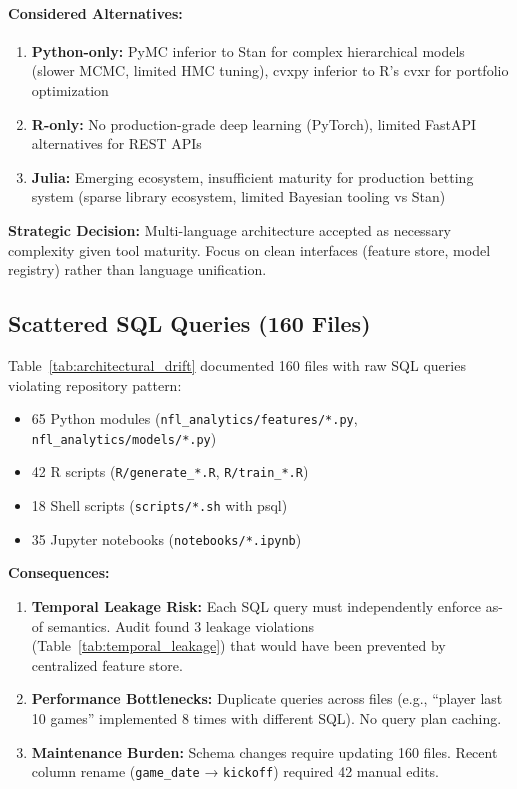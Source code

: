 \paragraph{Considered Alternatives:}
\begin{enumerate}
    \item \textbf{Python-only:} PyMC inferior to Stan for complex hierarchical models (slower MCMC, limited HMC tuning), cvxpy inferior to R's cvxr for portfolio optimization
    \item \textbf{R-only:} No production-grade deep learning (PyTorch), limited FastAPI alternatives for REST APIs
    \item \textbf{Julia:} Emerging ecosystem, insufficient maturity for production betting system (sparse library ecosystem, limited Bayesian tooling vs Stan)
\end{enumerate}

\textbf{Strategic Decision:} Multi-language architecture accepted as necessary complexity given tool maturity. Focus on clean interfaces (feature store, model registry) rather than language unification.

\subsection{Scattered SQL Queries (160 Files)}

Table~\ref{tab:architectural_drift} documented 160 files with raw SQL queries violating repository pattern:
\begin{itemize}
    \item 65 Python modules (\texttt{nfl\_analytics/features/*.py}, \texttt{nfl\_analytics/models/*.py})
    \item 42 R scripts (\texttt{R/generate\_*.R}, \texttt{R/train\_*.R})
    \item 18 Shell scripts (\texttt{scripts/*.sh} with psql)
    \item 35 Jupyter notebooks (\texttt{notebooks/*.ipynb})
\end{itemize}

\textbf{Consequences:}
\begin{enumerate}
    \item \textbf{Temporal Leakage Risk:} Each SQL query must independently enforce as-of semantics. Audit found 3 leakage violations (Table~\ref{tab:temporal_leakage}) that would have been prevented by centralized feature store.
    \item \textbf{Performance Bottlenecks:} Duplicate queries across files (e.g., ``player last 10 games'' implemented 8 times with different SQL). No query plan caching.
    \item \textbf{Maintenance Burden:} Schema changes require updating 160 files. Recent column rename (\texttt{game\_date} → \texttt{kickoff}) required 42 manual edits.
\end{enumerate}

